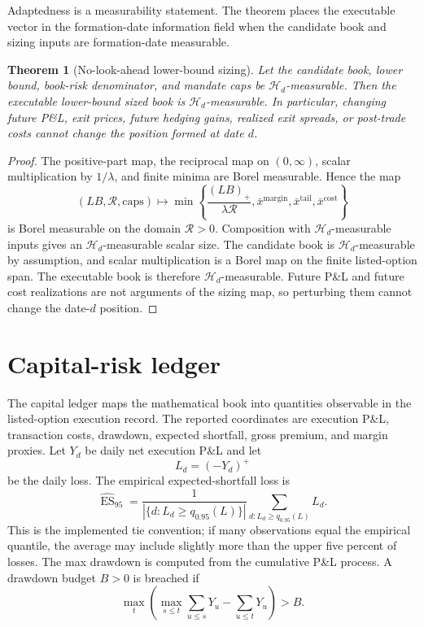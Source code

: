 \documentclass[11pt,a4paper]{amsart}
\theoremstyle{plain}
\newtheorem{theorem}{Theorem}[section]
\theoremstyle{definition}
\theoremstyle{remark}
\newcommand{\cH}{\mathcal{H}}
\newcommand{\ES}{\operatorname{ES}}
\begin{document}
Adaptedness is a measurability statement.  The theorem places the executable vector in the
formation-date information field when the candidate book and sizing inputs are formation-date
measurable.

\begin{theorem}[No-look-ahead lower-bound sizing]\label{thm:no-lookahead}
Let the candidate book, lower bound, book-risk denominator, and mandate caps be
\(\cH_d\)-measurable.  Then the executable lower-bound sized book is \(\cH_d\)-measurable.  In
particular, changing future P\&L, exit prices, future hedging gains, realized exit spreads, or
post-trade costs cannot change the position formed at date \(d\).
\end{theorem}

\begin{proof}
The positive-part map, the reciprocal map on \((0,\infty)\), scalar multiplication by
\(1/\lambda\), and finite minima are Borel measurable.  Hence the map
\[
        (LB,\mathcal R,\text{caps})
        \mapsto
        \min\left\{
        \frac{(LB)_+}{\lambda\mathcal R},
        \bar x^{\mathrm{margin}},
        \bar x^{\mathrm{tail}},
        \bar x^{\mathrm{cost}}
        \right\}
\]
is Borel measurable on the domain \(\mathcal R>0\).  Composition with \(\cH_d\)-measurable inputs
gives an \(\cH_d\)-measurable scalar size.  The candidate book is \(\cH_d\)-measurable by
assumption, and scalar multiplication is a Borel map on the finite listed-option span.  The
executable book is therefore \(\cH_d\)-measurable.  Future P\&L and future cost realizations are
not arguments of the sizing map, so perturbing them cannot change the date-\(d\) position.
\end{proof}

\section{Capital-risk ledger}\label{sec:capital}

The capital ledger maps the mathematical book into quantities observable in the listed-option
execution record.  The reported coordinates are execution P\&L, transaction costs, drawdown,
expected shortfall, gross premium, and margin proxies.  Let \(Y_d\) be daily net execution P\&L and
let
\[
        L_d=(-Y_d)^+
\]
be the daily loss.  The empirical expected-shortfall loss is
\[
        \widehat{\ES}_{95}
        =
        \frac{1}{|\{d:L_d\ge q_{0.95}(L)\}|}
        \sum_{d:L_d\ge q_{0.95}(L)}L_d.
\]
This is the implemented tie convention; if many observations equal the empirical quantile, the
average may include slightly more than the upper five percent of losses.  The max drawdown is
computed from the cumulative P\&L process.  A drawdown budget \(B>0\) is breached if
\[
        \max_t\left(\max_{s\le t}\sum_{u\le s}Y_u-\sum_{u\le t}Y_u\right)>B.
\]
\end{document}
